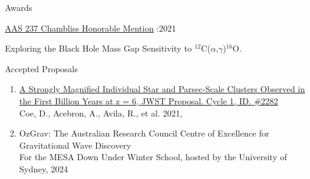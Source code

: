 \documentclass{resume} %
\begin{document}

\begin{rSection}{Awards}

\begin{rSubsection}{\href{https://aas.org/posts/news/2021/02/chambliss-student-poster-awards-aas-237}{AAS 237 Chambliss Honorable Mention} :}{2021}{}
\item Exploring the Black Hole Mass Gap Sensitivity to $^{12}$C($\alpha$,$\gamma$)$^{16}$O. 
\end{rSubsection}
\end{rSection}








\begin{rSection}{Accepted Proposals}
\begin{enumerate}
    \item \href{https://ui.adsabs.harvard.edu/abs/2021jwst.prop.2282C/abstract}{A Strongly Magnified Individual Star and Parsec-Scale Clusters Observed in the First Billion Years at z = 6, JWST Proposal. Cycle 1, ID. \#2282}
    \\ Coe, D., Acebron, A., Avila, R., et al. 2021,  

    \item OzGrav: The Australian Research Council Centre of Excellence for Gravitational Wave Discovery
    \\ For the MESA Down Under Winter School, hosted by the University of Sydney, 2024
\end{enumerate}    
\end{rSection}
\end{document}
